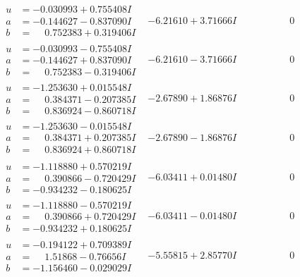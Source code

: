 \documentclass[1p]{elsarticle_modified}
\theoremstyle{definition}
\begin{document}
$$\begin{array}{c|c|c}
\begin{aligned}
u &= -0.030993 + 0.755408 I \\
a &= -0.144627 - 0.837090 I \\
b &= \phantom{-}0.752383 + 0.319406 I\end{aligned}
 & -6.21610 + 3.71666 I & \phantom{-0.000000 } 0 \\ \hline\begin{aligned}
u &= -0.030993 - 0.755408 I \\
a &= -0.144627 + 0.837090 I \\
b &= \phantom{-}0.752383 - 0.319406 I\end{aligned}
 & -6.21610 - 3.71666 I & \phantom{-0.000000 } 0 \\ \hline\begin{aligned}
u &= -1.253630 + 0.015548 I \\
a &= \phantom{-}0.384371 - 0.207385 I \\
b &= \phantom{-}0.836924 - 0.860718 I\end{aligned}
 & -2.67890 + 1.86876 I & \phantom{-0.000000 } 0 \\ \hline\begin{aligned}
u &= -1.253630 - 0.015548 I \\
a &= \phantom{-}0.384371 + 0.207385 I \\
b &= \phantom{-}0.836924 + 0.860718 I\end{aligned}
 & -2.67890 - 1.86876 I & \phantom{-0.000000 } 0 \\ \hline\begin{aligned}
u &= -1.118880 + 0.570219 I \\
a &= \phantom{-}0.390866 - 0.720429 I \\
b &= -0.934232 - 0.180625 I\end{aligned}
 & -6.03411 + 0.01480 I & \phantom{-0.000000 } 0 \\ \hline\begin{aligned}
u &= -1.118880 - 0.570219 I \\
a &= \phantom{-}0.390866 + 0.720429 I \\
b &= -0.934232 + 0.180625 I\end{aligned}
 & -6.03411 - 0.01480 I & \phantom{-0.000000 } 0 \\ \hline\begin{aligned}
u &= -0.194122 + 0.709389 I \\
a &= \phantom{-}1.51868 - 0.76656 I \\
b &= -1.156460 - 0.029029 I\end{aligned}
 & -5.55815 + 2.85770 I & \phantom{-0.000000 } 0 \\ \hline\begin{aligned}

\end{aligned}
\end{array}$$
\end{document}
